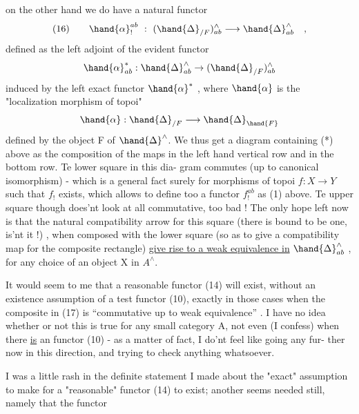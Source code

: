 
on the other hand we do have  a natural functor
\[(16)\qquad \hand{\alpha}^{ab}_{!} \ : \ (\hand{\Delta}_{/F})^{\wedge}_{ab} \longrightarrow \hand{\Delta}^{\wedge}_{ab} \quad ,\]
defined as the left adjoint of the evident functor
\[\hand{\alpha}^{*}_{ab} : \hand{\Delta}^{\wedge}_{ab} \to (\hand{\Delta}_{/F})^{\wedge}_{ab}\]
induced by the left exact functor $\hand{\alpha}^{*}$ , where $\hand{\alpha}$ is the 
"localization morphism of topoi"
\[\hand{\alpha} : \hand{\Delta}_{/F} \longrightarrow \hand{\Delta}_{\hand{F}}\]
defined by the object F of $\hand{\Delta}^{\wedge}$. We thus get a diagram
containing (*) above as the composition of the maps in the left hand
vertical row and  in the bottom row. Te lower square in this dia-%
gram commutes (up to canonical isomorphism) - which is a general fact
surely for morphisms of topoi $f : X \longrightarrow Y$ such that $f_{!}$ exists, which
allows to define too a functor $f^{ab}_{!}$ as (1) above. Te upper
square though does'nt look at all commutative, too bad ! The only
hope left now is that the natural compatibility arrow for this square
(there is bound to be one, is'nt it !) , when composed with the lower
square (so as to give a compatibility map for the composite rectangle)
\uline{ give rise to a weak equivalence in} $\hand{\Delta}^{\wedge}_{ab}$ , for any choice of
an object X in $A^{\wedge}$.

It would seem to me that a reasonable functor (14) will exist,
without an existence assumption of a test functor (10), exactly in
those cases when the composite  in (17) is ``commutative up to
weak equivalence'' . I have no idea whether or not this is true for
any small category A, not even (I confess) when there \uline{is} an
functor (10) - as a matter of fact, I do'nt feel like going any fur-%
ther now in this direction, and trying to check anything whatsoever.

I was a little rash in the definite statement I made about
the "exact" assumption to make for a "reasonable" functor (14) to
exist; another seems needed still, namely that the functor

